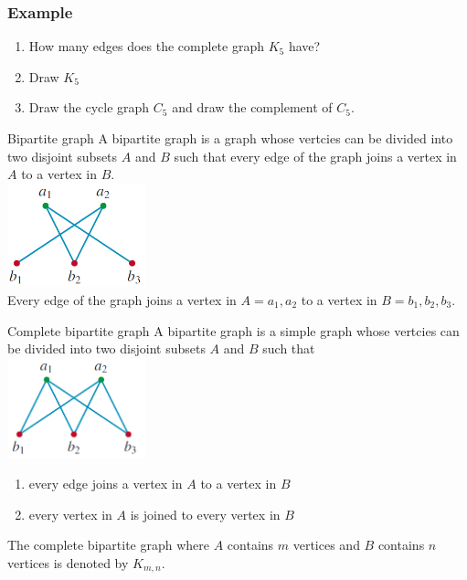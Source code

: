 \documentclass[
	11pt, %
]{beamer}
\begin{document}
\begin{frame}[t]
    \frametitle{Example}
    \begin{enumerate}
        \item How many edges does the complete graph $K_5$ have?
        \item Draw $K_5$
        \item Draw the cycle graph $C_5$ and draw the complement of $C_5$.
    \end{enumerate}
\end{frame}

\begin{frame}{Bipartite graph}
    A bipartite graph is a graph whose vertcies can be divided into two disjoint subsets $A$ and $B$ such that every edge of the graph joins a vertex in
    $A$ to a vertex in $B$.\\
    \includegraphics[width = 4cm]{Bipart.png}\\
    Every edge of the graph joins a vertex in $A = {a_1, a_2}$ to a vertex in $B = {b_1, b_2, b_3}$.
\end{frame}

\begin{frame}{Complete bipartite graph}
    A bipartite graph is a simple graph whose vertcies can be divided into two disjoint subsets $A$ and $B$ such that\\
    \includegraphics[width = 4cm]{C_bipart.png}\\
    \begin{enumerate}
        \item every edge joins a vertex in $A$ to a vertex in $B$
        \item every vertex in $A$ is joined to every vertex in $B$
    \end{enumerate}
    The complete bipartite graph where $A$ contains $m$ vertices and $B$ contains $n$ vertices is denoted by $K_{m,n}$.
\end{frame}
\end{document}
